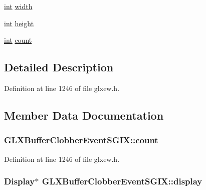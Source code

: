\begin{DoxyCompactItemize}
\item 
\hyperlink{wglew_8h_a500a82aecba06f4550f6849b8099ca21}{int} \hyperlink{struct_g_l_x_buffer_clobber_event_s_g_i_x_adad23535733161528427584a42bfc6eb}{width}
\item 
\hyperlink{wglew_8h_a500a82aecba06f4550f6849b8099ca21}{int} \hyperlink{struct_g_l_x_buffer_clobber_event_s_g_i_x_a7838dbabb76c22aa8241310a3f2363ea}{height}
\item 
\hyperlink{wglew_8h_a500a82aecba06f4550f6849b8099ca21}{int} \hyperlink{struct_g_l_x_buffer_clobber_event_s_g_i_x_ad8f4f0aae058e0a1ff542679823e37a9}{count}
\end{DoxyCompactItemize}


\subsection{Detailed Description}


Definition at line 1246 of file glxew.\-h.



\subsection{Member Data Documentation}
\hypertarget{struct_g_l_x_buffer_clobber_event_s_g_i_x_ad8f4f0aae058e0a1ff542679823e37a9}{
\subsubsection[{count}]{ G\-L\-X\-Buffer\-Clobber\-Event\-S\-G\-I\-X\-::count}}\label{struct_g_l_x_buffer_clobber_event_s_g_i_x_ad8f4f0aae058e0a1ff542679823e37a9}


Definition at line 1246 of file glxew.\-h.

\hypertarget{struct_g_l_x_buffer_clobber_event_s_g_i_x_afef060d81026da75c846727f4a3de9d4}{
\subsubsection[{display}]{\setlength{\rightskip}{0pt plus 5cm}Display$\ast$ G\-L\-X\-Buffer\-Clobber\-Event\-S\-G\-I\-X\-::display}}\label{struct_g_l_x_buffer_clobber_event_s_g_i_x_afef060d81026da75c846727f4a3de9d4}


